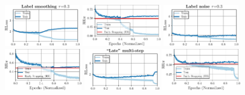\begin{figure}[t]
\begin{minipage}[t]{0.19\textwidth}
		\includegraphics[height=1.8cm]{plots_supp_training_curves_ls03_loss}
		
		\hspace*{-0.25cm}
		\includegraphics[height=1.8cm]{plots_supp_training_curves_ls03_error}
	\end{minipage}
	\begin{minipage}[t]{0.19\textwidth}
		\vspace*{0px}
		
		\includegraphics[height=1.8cm]{plots_supp_training_curves_ln03_loss}
		
		\hspace*{-0.25cm}
		\includegraphics[height=1.8cm]{plots_supp_training_curves_ln03_error}
	\end{minipage}
	\begin{minipage}[t]{0.19\textwidth}
		\vspace*{0px}
		
		\includegraphics[height=1.8cm]{plots_supp_training_curves_late_loss}
		
		\hspace*{-0.25cm}
		\includegraphics[height=1.8cm]{plots_supp_training_curves_late_error}
	\end{minipage}
	\begin{minipage}[t]{0.19\textwidth}
		\vspace*{0px}
		

\end{minipage}
\end{figure}
